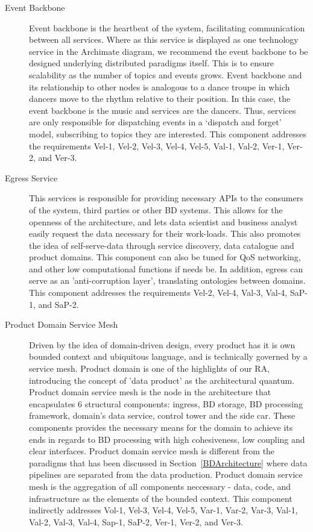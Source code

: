 \documentclass[a4paper,11pt]{article}
\begin{document}
\begin{description}
    \item[Event Backbone] Event backbone is the heartbeat of the system, facilitating communication between all services. Where as this service is displayed as one technology service in the Archimate diagram, we recommend the event backbone to be designed underlying distributed paradigms itself. This is to ensure scalability as the number of topics and events grows. Event backbone and its relationship to other nodes is analogous to a dance troupe in which dancers move to the rhythm relative to their position. In this case, the event backbone is the music and services are the dancers. Thus, services are only responsible for dispatching events in a `dispatch and forget' model, subscribing to topics they are interested. This component addresses the requirements Vel-1, Vel-2, Vel-3, Vel-4, Vel-5, Val-1, Val-2, Ver-1, Ver-2, and Ver-3.
    
    \item[Egress Service] This services is responsible for providing necessary APIs to the consumers of the system, third parties or other BD systems. This allows for the openness of the architecture, and lets data scientist and business analyst easily request the data necessary for their work-loads. This also promotes the idea of self-serve-data through service discovery, data catalogue and product domains. This component can also be tuned for QoS networking, and other low computational functions if needs be. In addition, egress can serve as an 'anti-corruption layer', translating ontologies between domains. This component addresses the requirements Vel-2, Vel-4, Val-3, Val-4, SaP-1, and SaP-2. 
    
    \item[Product Domain Service Mesh] Driven by the idea of domain-driven design, every product has it is own bounded context and ubiquitous language, and is technically governed by a service mesh. Product domain is one of the highlights of our RA, introducing the concept of 'data product' as the architectural quantum. Product domain service mesh is the node in the architecture that encapsulates 6 structural components: ingress, BD storage, BD processing framework, domain's data service, control tower and the side car. These components provides the necessary means for the domain to achieve its ends in regards to BD processing with high cohesiveness, low coupling and clear interfaces. Product domain service mesh is different from the paradigms that has been discussed in Section~\ref{BDArchitecture} where data pipelines are separated from the data production. Product domain service mesh is the aggregation of all components neccessary - data, code, and infrastructure as the elements of the bounded context. This component indirectly addresses Vol-1, Vel-3, Vel-4, Vel-5, Var-1, Var-2, Var-3, Val-1, Val-2, Val-3, Val-4, Sap-1, SaP-2, Ver-1, Ver-2, and Ver-3.
    

\end{description}
\end{document}
